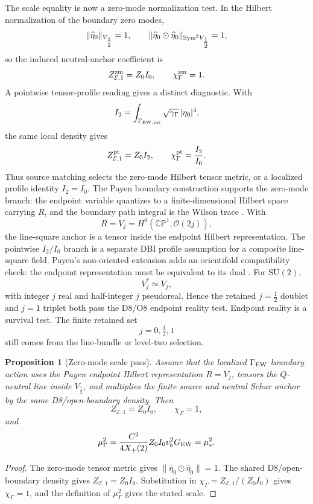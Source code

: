 \documentclass[11pt]{article}
\newtheorem{proposition}{Proposition}
\theoremstyle{definition}
\theoremstyle{remark}
\newcommand{\SU}{\mathrm{SU}}
\newcommand{\CP}{\mathbb{CP}}
\newcommand{\half}{\tfrac12}
\newcommand{\cO}{\mathcal O}
\newcommand{\Xp}{X_+}
\begin{document}
The scale equality is now a zero-mode normalization test.  In the Hilbert
normalization of the boundary zero modes,
\[
  \|\widehat\eta_0\|_{V_{\half}}=1,
  \qquad
  \|\widehat\eta_0\odot\widehat\eta_0\|_{{\rm Sym}^2V_{\half}}=1,
\]
so the induced neutral-anchor coefficient is
\[
  Z_{\mathcal E,1}^{\rm zm}=Z_0I_0,
  \qquad
  \chi_\Gamma^{\rm zm}=1.
\]
A pointwise tensor-profile reading gives a distinct diagnostic.  With
\[
  I_2=
  \int_{\Gamma_{\rm EW,int}}
  \sqrt{\gamma_\Gamma}\,|\eta_0|^4 ,
\]
the same local density gives
\[
  Z_{\mathcal E,1}^{\rm pt}=Z_0I_2,
  \qquad
  \chi_\Gamma^{\rm pt}=\frac{I_2}{I_0}.
\]
Thus source matching selects the zero-mode Hilbert tensor metric, or a
localized profile identity \(I_2=I_0\).
The Payen boundary construction supports the zero-mode branch: the endpoint
variable quantizes to a finite-dimensional Hilbert space carrying \(R\), and
the boundary path integral is the Wilson trace \cite{Payen2007}.  With
\[
  R=V_j=H^0(\CP^1,\cO(2j)),
\]
the line-square anchor is a tensor inside the endpoint Hilbert representation.
The pointwise \(I_2/I_0\) branch is a separate DBI profile assumption for a
composite line-square field.
Payen's non-oriented extension adds an orientifold compatibility check:
the endpoint representation must be equivalent to its dual
\cite{Payen2007}.  For \(\SU(2)\),
\[
  V_j^*\simeq V_j,
\]
with integer \(j\) real and half-integer \(j\) pseudoreal.  Hence the retained
\(j=\half\) doublet and \(j=1\) triplet both pass the D8/O8 endpoint reality
test.
Endpoint reality is a survival test.  The finite retained set
\[
  j=0,\half,1
\]
still comes from the line-bundle or level-two selection.

\begin{proposition}[Zero-mode scale pass]
Assume that the localized \(\Gamma_{\rm EW}\) boundary action uses the Payen
endpoint Hilbert representation \(R=V_j\), tensors the \(Q\)-neutral line
inside \(V_{\half}\), and multiplies the finite source and neutral Schur
anchor by the same D8/open-boundary density.  Then
\[
  Z_{\mathcal E,1}=Z_0I_0,
  \qquad
  \chi_\Gamma=1,
\]
and
\[
  \mu_\Gamma^2
  =
  \frac{C^2}{4\Xp(2)}Z_0I_0v_b^2G_{\rm EW}
  =
  \mu_*^2 .
\]
\end{proposition}

\begin{proof}
The zero-mode tensor metric gives
\(\|\widehat\eta_0\odot\widehat\eta_0\|=1\).  The shared
D8/open-boundary density gives \(Z_{\mathcal E,1}=Z_0I_0\).  Substitution in
\(\chi_\Gamma=Z_{\mathcal E,1}/(Z_0I_0)\) gives \(\chi_\Gamma=1\), and the
definition of \(\mu_\Gamma^2\) gives the stated scale.
\end{proof}
\end{document}
